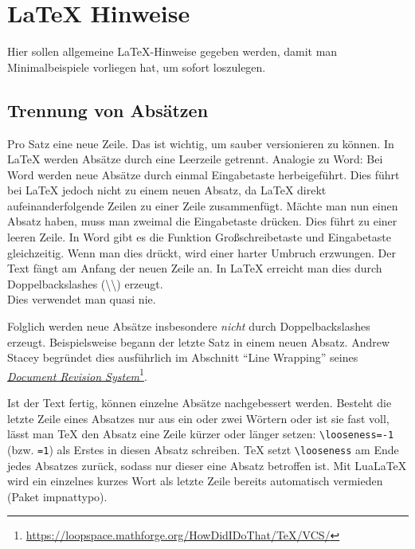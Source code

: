 \documentclass[../thesis-example]{subfiles}
\begin{document}
\chapter{LaTeX Hinweise}
\label{sec:latexhints}

Hier sollen allgemeine \LaTeX-Hinweise gegeben werden, damit man Minimalbeispiele vorliegen hat, um sofort loszulegen.

\section{Trennung von Absätzen}

\begin{ltgexample}
Pro Satz eine neue Zeile.
Das ist wichtig, um sauber versionieren zu können.
In LaTeX werden Absätze durch eine Leerzeile getrennt.
Analogie zu Word: Bei Word werden neue Absätze durch einmal Eingabetaste herbeigeführt.
Dies führt bei LaTeX jedoch nicht zu einem neuen Absatz, da LaTeX direkt aufeinanderfolgende Zeilen zu einer Zeile zusammenfügt.
Mächte man nun einen Absatz haben, muss man zweimal die Eingabetaste drücken.
Dies führt zu einer leeren Zeile.
In Word gibt es die Funktion Großschreibetaste und Eingabetaste gleichzeitig.
Wenn man dies drückt, wird einer harter Umbruch erzwungen.
Der Text fängt am Anfang der neuen Zeile an.
In LaTeX erreicht man dies durch Doppelbackslashes (\textbackslash\textbackslash) erzeugt.
\\
Dies verwendet man quasi nie.

Folglich werden neue Absätze insbesondere \emph{nicht} durch Doppelbackslashes erzeugt.
Beispielsweise begann der letzte Satz in einem neuen Absatz.
Andrew Stacey begründet dies ausführlich im Abschnitt \enquote{Line Wrapping} seines \href{https://loopspace.mathforge.org/HowDidIDoThat/TeX/VCS/#section.3}{\emph{Document Revision System}}\footnote{\url{https://loopspace.mathforge.org/HowDidIDoThat/TeX/VCS/}}.
\end{ltgexample}

Ist der Text fertig, können einzelne Absätze nachgebessert werden.
Besteht die letzte Zeile eines Absatzes nur aus ein oder zwei Wörtern oder ist sie fast voll, lässt man TeX den Absatz eine Zeile kürzer oder länger setzen: \texttt{\textbackslash looseness=-1} (bzw. \texttt{=1}) als Erstes in diesen Absatz schreiben.
TeX setzt \texttt{\textbackslash looseness} am Ende jedes Absatzes zurück, sodass nur dieser eine Absatz betroffen ist.
Mit LuaLaTeX wird ein einzelnes kurzes Wort als letzte Zeile bereits automatisch vermieden (Paket impnattypo).
\end{document}
